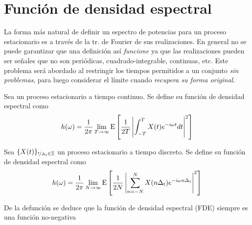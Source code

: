 
\section{Función de densidad espectral}

La forma más natural de definir un espectro de potencias para un proceso estacionario es a través 
de la tr. de Fourier de sus realizaciones. En general no se puede garantizar que una definición así \textit{funcione} ya que las realizaciones pueden ser señales que no son periódicas, 
cuadrado-integrable, continuas, etc.
%
Este problema será abordado al restringir los tiempos permitidos a un conjunto \textit{sin 
problemas}, para luego considerar el límite cuando \textit{recupera su forma original}.

\begin{definicion}
Sea \xt un proceso estacionario a tiempo continuo. Se define su {función de densidad 
espectral} como
\begin{equation}
h(\omega) = \frac{1}{2 \pi} \lim_{T\rightarrow \infty} \mathrm{E}\left[  \frac{1}{2T} 
\left|  \int_{-T}^{T} X(t) e^{-i \omega t} dt \right|^{2}  \right]
\label{txt_FDE_cont}
\end{equation}
\end{definicion}

\begin{definicion}
Sea $\{X(t)\}_{\nicefrac{t}{\Delta_t}\in \mathbb{Z}}$ un proceso estacionario a tiempo discreto. Se 
define su {función de densidad espectral} como
\begin{equation}
h(\omega) = \frac{1}{2 \pi} \lim_{N\rightarrow \infty} \mathrm{E}\left[  \frac{1}{2N} 
\left|  \sum_{n=-N}^{N} X(n \Delta_t) e^{-i \omega n \Delta_t} \right|^{2}  \right]
\label{txt_FDE_disc}
\end{equation}
\end{definicion}

De la defunción se deduce que la función de densidad espectral (FDE) siempre es una función
no-negativa



